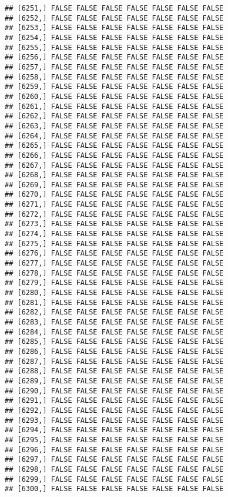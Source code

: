 \documentclass[
]{article}
\begin{document}
\begin{verbatim}
## [6251,] FALSE FALSE FALSE FALSE FALSE FALSE FALSE
## [6252,] FALSE FALSE FALSE FALSE FALSE FALSE FALSE
## [6253,] FALSE FALSE FALSE FALSE FALSE FALSE FALSE
## [6254,] FALSE FALSE FALSE FALSE FALSE FALSE FALSE
## [6255,] FALSE FALSE FALSE FALSE FALSE FALSE FALSE
## [6256,] FALSE FALSE FALSE FALSE FALSE FALSE FALSE
## [6257,] FALSE FALSE FALSE FALSE FALSE FALSE FALSE
## [6258,] FALSE FALSE FALSE FALSE FALSE FALSE FALSE
## [6259,] FALSE FALSE FALSE FALSE FALSE FALSE FALSE
## [6260,] FALSE FALSE FALSE FALSE FALSE FALSE FALSE
## [6261,] FALSE FALSE FALSE FALSE FALSE FALSE FALSE
## [6262,] FALSE FALSE FALSE FALSE FALSE FALSE FALSE
## [6263,] FALSE FALSE FALSE FALSE FALSE FALSE FALSE
## [6264,] FALSE FALSE FALSE FALSE FALSE FALSE FALSE
## [6265,] FALSE FALSE FALSE FALSE FALSE FALSE FALSE
## [6266,] FALSE FALSE FALSE FALSE FALSE FALSE FALSE
## [6267,] FALSE FALSE FALSE FALSE FALSE FALSE FALSE
## [6268,] FALSE FALSE FALSE FALSE FALSE FALSE FALSE
## [6269,] FALSE FALSE FALSE FALSE FALSE FALSE FALSE
## [6270,] FALSE FALSE FALSE FALSE FALSE FALSE FALSE
## [6271,] FALSE FALSE FALSE FALSE FALSE FALSE FALSE
## [6272,] FALSE FALSE FALSE FALSE FALSE FALSE FALSE
## [6273,] FALSE FALSE FALSE FALSE FALSE FALSE FALSE
## [6274,] FALSE FALSE FALSE FALSE FALSE FALSE FALSE
## [6275,] FALSE FALSE FALSE FALSE FALSE FALSE FALSE
## [6276,] FALSE FALSE FALSE FALSE FALSE FALSE FALSE
## [6277,] FALSE FALSE FALSE FALSE FALSE FALSE FALSE
## [6278,] FALSE FALSE FALSE FALSE FALSE FALSE FALSE
## [6279,] FALSE FALSE FALSE FALSE FALSE FALSE FALSE
## [6280,] FALSE FALSE FALSE FALSE FALSE FALSE FALSE
## [6281,] FALSE FALSE FALSE FALSE FALSE FALSE FALSE
## [6282,] FALSE FALSE FALSE FALSE FALSE FALSE FALSE
## [6283,] FALSE FALSE FALSE FALSE FALSE FALSE FALSE
## [6284,] FALSE FALSE FALSE FALSE FALSE FALSE FALSE
## [6285,] FALSE FALSE FALSE FALSE FALSE FALSE FALSE
## [6286,] FALSE FALSE FALSE FALSE FALSE FALSE FALSE
## [6287,] FALSE FALSE FALSE FALSE FALSE FALSE FALSE
## [6288,] FALSE FALSE FALSE FALSE FALSE FALSE FALSE
## [6289,] FALSE FALSE FALSE FALSE FALSE FALSE FALSE
## [6290,] FALSE FALSE FALSE FALSE FALSE FALSE FALSE
## [6291,] FALSE FALSE FALSE FALSE FALSE FALSE FALSE
## [6292,] FALSE FALSE FALSE FALSE FALSE FALSE FALSE
## [6293,] FALSE FALSE FALSE FALSE FALSE FALSE FALSE
## [6294,] FALSE FALSE FALSE FALSE FALSE FALSE FALSE
## [6295,] FALSE FALSE FALSE FALSE FALSE FALSE FALSE
## [6296,] FALSE FALSE FALSE FALSE FALSE FALSE FALSE
## [6297,] FALSE FALSE FALSE FALSE FALSE FALSE FALSE
## [6298,] FALSE FALSE FALSE FALSE FALSE FALSE FALSE
## [6299,] FALSE FALSE FALSE FALSE FALSE FALSE FALSE
## [6300,] FALSE FALSE FALSE FALSE FALSE FALSE FALSE

\end{verbatim}
\end{document}
